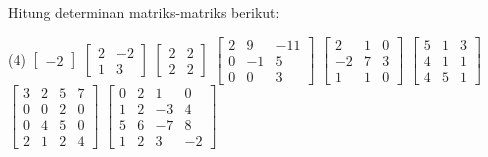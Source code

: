 \begin{exercise}
\pagebreak[2]
Hitung determinan matriks-matriks berikut:
\begin{tasks}(4)
\task
$\begin{bmatrix}
-2
\end{bmatrix}$
\task
$\begin{bmatrix}
2 & -2 \\
1 & 3
\end{bmatrix}$
\task
$\begin{bmatrix}
2 & 2 \\
2 & 2
\end{bmatrix}$
\task
$\begin{bmatrix}
2 & 9 & -11 \\
0 & -1 & 5 \\
0 & 0 & 3
\end{bmatrix}$
\task
$\begin{bmatrix}
2 & 1 & 0 \\
-2 & 7 & 3 \\
1 & 1 & 0
\end{bmatrix}$
\task
$\begin{bmatrix}
5 & 1 & 3 \\
4 & 1 & 1 \\
4 & 5 & 1
\end{bmatrix}$
\task
$\begin{bmatrix}
3 & 2 & 5 & 7 \\
0 & 0 & 2 & 0 \\
0 & 4 & 5 & 0 \\
2 & 1 & 2 & 4
\end{bmatrix}$
\task
$\begin{bmatrix}
 0 &  2 &  1 &  0 \\
 1 &  2 & -3 &  4 \\
 5 &  6 & -7 &  8 \\
 1 &  2 &  3 & -2
\end{bmatrix}$
\end{tasks}
\end{exercise}

